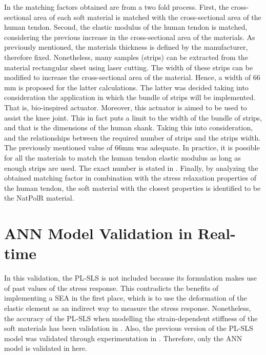 In  the matching factors obtained are from a two fold process. First, the cross-sectional area of each soft material is matched with the cross-sectional area of the human tendon. Second, the elastic modulus of the human tendon is matched, considering the previous increase in the cross-sectional area of the materials. As previously mentioned, the materials thickness is defined by the manufacturer, therefore fixed. Nonetheless, many samples (strips) can be extracted from the material rectangular sheet using laser cutting. The width of these strips can be modified to increase the cross-sectional area of the material. Hence, a width of 66 mm is proposed for the latter calculations. The latter was decided taking into consideration the application in which the bundle of strips will be implemented. That is, bio-inspired actuator. Moreover, this actuator is aimed to be used to assist the knee joint. This in fact puts a limit to the width of the bundle of strips, and that is the dimensions of the human shank. Taking this into consideration, and the relationships between the required number of strips and the strips width. The previously mentioned value of 66mm was adequate. In practice, it is possible for all the materials to match the human tendon elastic modulus as long as enough strips are used. The exact number is stated in . Finally, by analyzing the obtained matching factor in combination with the stress relaxation properties of the human tendon, the soft material with the closest properties is identified to be the NatPolR material.

\section{ANN Model Validation in Real-time}

In this validation, the PL-SLS is not included because its formulation makes use of past values of the stress response. This contradicts the benefits of implementing a SEA in the first place, which is to use the deformation of the elastic element as an indirect way to measure the stress response. Nonetheless, the accuracy of the PL-SLS when modelling the strain-dependent stiffness of the soft materials has been validation in . Also, the previous version of the PL-SLS model was validated through experimentation in \cite{austin2015control}. Therefore, only the ANN model is validated in here. 

